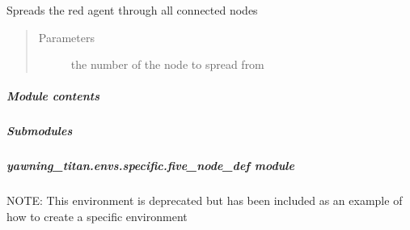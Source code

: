 \documentclass[letterpaper,10pt,english]{sphinxmanual}
\begin{document}
\begin{fulllineitems}

\begin{fulllineitems}
\label{\detokenize{source/yawning_titan.envs.specific.core:yawning_titan.envs.specific.core.nsa_node_collection.NodeCollection.spread}}
\sphinxAtStartPar
Spreads the red agent through all connected nodes
\begin{quote}\begin{description}
\item[{Parameters}] \leavevmode
\sphinxAtStartPar
{} \textendash{} the number of the node to spread from

\end{description}\end{quote}

\end{fulllineitems}


\end{fulllineitems}



\subparagraph{Module contents}
\label{\detokenize{source/yawning_titan.envs.specific.core:module-yawning_titan.envs.specific.core}}\label{\detokenize{source/yawning_titan.envs.specific.core:module-contents}}

\subparagraph{Submodules}
\label{\detokenize{source/yawning_titan.envs.specific:submodules}}

\subparagraph{yawning\_titan.envs.specific.five\_node\_def module}
\label{\detokenize{source/yawning_titan.envs.specific:module-yawning_titan.envs.specific.five_node_def}}\label{\detokenize{source/yawning_titan.envs.specific:yawning-titan-envs-specific-five-node-def-module}}
\sphinxAtStartPar
NOTE: This environment is deprecated but has been included as an example of how to create a specific environment
\end{document}
